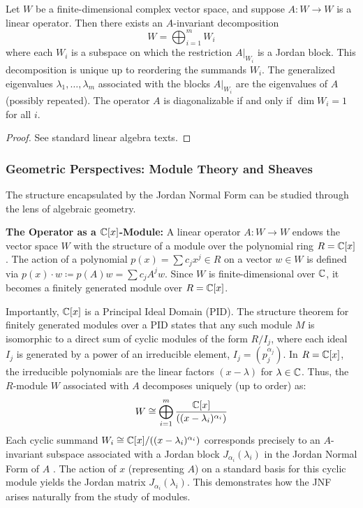\begin{theorem} \label{thm:jordan_decomp}
Let $W$ be a finite-dimensional complex vector space, and suppose $A: W \to W$ is a linear operator. Then there exists an $A$-invariant decomposition
\begin{equation*} \label{eq:4.8}
W = \bigoplus_{i=1}^{m} W_i
\end{equation*}
where each $W_i$ is a subspace on which the restriction $A|_{W_i}$ is a Jordan block. This decomposition is unique up to reordering the summands $W_i$. The generalized eigenvalues $\lambda_1, \dots, \lambda_m$ associated with the blocks $A|_{W_i}$ are the eigenvalues of $A$ (possibly repeated). The operator $A$ is diagonalizable if and only if $\dim W_i = 1$ for all $i$.
\end{theorem}
\begin{proof}
See standard linear algebra texts.
\end{proof}

\subsubsection{Geometric Perspectives: Module Theory and Sheaves}
\label{subsec:module_sheaf}

The structure encapsulated by the Jordan Normal Form can be studied through the lens of algebraic geometry.

\textbf{The Operator as a $\mathbb{C}[x]$-Module:}
A linear operator $A: W \to W$ endows the vector space $W$ with the structure of a module over the polynomial ring $R = \mathbb{C}[x]$. The action of a polynomial $p(x) = \sum c_j x^j \in R$ on a vector $w \in W$ is defined via $p(x) \cdot w \coloneqq p(A)w = \sum c_j A^j w$. Since $W$ is finite-dimensional over $\mathbb{C}$, it becomes a finitely generated module over $R = \mathbb{C}[x]$.

Importantly, $\mathbb{C}[x]$ is a Principal Ideal Domain (PID). The structure theorem for finitely generated modules over a PID states that any such module $M$ is isomorphic to a direct sum of cyclic modules of the form $R/I_j$, where each ideal $I_j$ is generated by a power of an irreducible element, $I_j = (p_j^{\alpha_j})$. In $R = \mathbb{C}[x]$, the irreducible polynomials are the linear factors $(x - \lambda)$ for $\lambda \in \mathbb{C}$. Thus, the $R$-module $W$ associated with $A$ decomposes uniquely (up to order) as:
\[ W \cong \bigoplus_{i=1}^{m} \dfrac{\mathbb{C}[x]}{((x - \lambda_i)^{\alpha_i})} \]
Each cyclic summand $W_i \cong \mathbb{C}[x] / ((x - \lambda_i)^{\alpha_i})$ corresponds precisely to an $A$-invariant subspace associated with a Jordan block $J_{\alpha_i}(\lambda_i)$ in the Jordan Normal Form of $A$ . The action of $x$ (representing $A$) on a standard basis for this cyclic module yields the Jordan matrix $J_{\alpha_i}(\lambda_i)$. This demonstrates how the JNF arises naturally from the study of modules.

